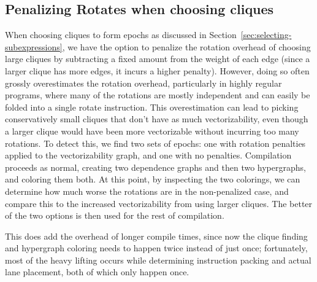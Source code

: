 \subsection{Penalizing Rotates when choosing cliques}\label{sec:penalizing-rotates}
When choosing cliques to form epochs as discussed in Section~\ref{sec:selecting-subexpressions}, we have the option to penalize the rotation overhead of choosing large cliques by subtracting a fixed amount from the weight of each edge (since a larger clique has more edges, it incurs a higher penalty).
However, doing so often grossly overestimates the rotation overhead, particularly in highly regular programs, where many of the rotations are mostly independent and can easily be folded into a single rotate instruction.
This overestimation can lead to picking conservatively small cliques that don't have as much vectorizability, even though a larger clique would have been more vectorizable without incurring too many rotations.
To detect this, we find two sets of epochs: one with rotation penalties applied to the vectorizability graph, and one with no penalties.
Compilation proceeds as normal, creating two dependence graphs and then two hypergraphs, and coloring them both.
At this point, by inspecting the two colorings, we can determine how much worse the rotations are in the non-penalized case, and compare this to the increased vectorizability from using larger cliques.
The better of the two options is then used for the rest of compilation.

This does add the overhead of longer compile times, since now the clique finding and hypergraph coloring needs to happen twice instead of just once; fortunately, most of the heavy lifting occurs while determining instruction packing and actual lane placement, both of which only happen once.
